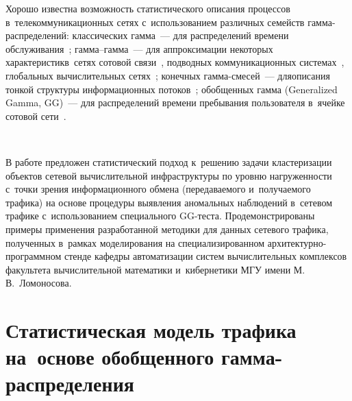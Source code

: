 \begin{multicols}{2}
Хорошо известна воз\-мож\-ность ста\-ти\-сти\-че\-ско\-го описания процессов 
в~телекоммуникационных сетях с~использованием различных семейств 
гам\-ма-рас\-пре\-де\-ле\-ний: классических гамма~--- для распределений времени 
обслуживания~\cite{Parulekar1997}; гам\-ма--гам\-ма~--- для аппроксимации некоторых 
характеристик\linebreak в~сетях сотовой связи~\cite{Tabassum2014}, подводных 
коммуникационных сис\-те\-мах~\cite{Noor2022}, глобальных вы\-чис\-ли\-тель\-ных 
сетях~\cite{Padhan2023}; конечных гам\-ма-сме\-сей~--- для\linebreak описания тон\-кой структуры 
информационных потоков~\cite{Gorshenin2013a,Gorshenin2013b,Gorshenin2015,Gorshenin2016a,Gorshen
in2017a}; обобщенных гамма  (Generalized Gamma, GG)~--- для распределений времени 
пребывания пользователя в~ячейке сотовой сети~\cite{Zonoozi1996}.

\begin{figure*} %
\vspace*{1pt}
\begin{center}
   \mbox{%
\epsfxsize=151.725mm 
}
\end{center}
\vspace*{-6pt}
    \label{some_timestamp_example}
\end{figure*}

В работе предложен ста\-ти\-сти\-че\-ский подход к~решению задачи клас\-те\-ри\-за\-ции объектов 
сетевой вычис\-ли\-тель\-ной инфраструктуры по уровню на\-гру\-жен\-ности с~точ\-ки зрения 
информационного обмена (передаваемого и~по\-лу\-ча\-емо\-го трафика) на основе процедуры 
вы\-яв\-ле\-ния аномальных наблюдений в~сетевом трафике с~использованием специального 
GG-тес\-та. Продемонстрированы примеры применения разработанной методики для 
данных сетевого трафика, полученных в~рамках моделирования на специализированном 
ар\-хи\-тек\-тур\-но-про\-грам\-мном стенде ка\-фед\-ры автоматизации сис\-тем вы\-чис\-ли\-тель\-ных 
комплексов факультета вы\-чис\-ли\-тель\-ной математики и~кибернетики МГУ имени 
М.\,В.~Ло\-мо\-но\-сова. 

\vspace*{-4pt}

\section{Статистическая модель трафика на~основе обобщенного гамма-распределения}


\end{multicols}

